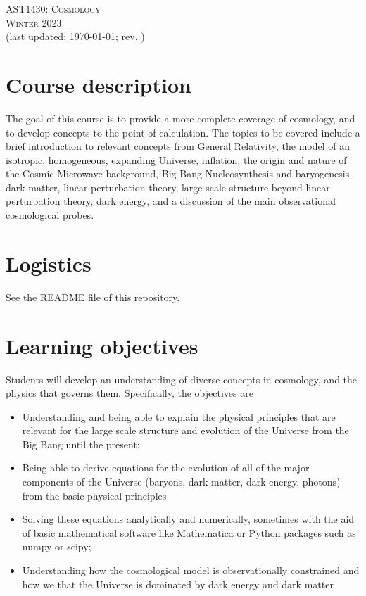 \documentclass{article}
\begin{document}
\begin{center}
  \LARGE{\scshape{AST1430: Cosmology}}\\[5pt]
  \Large{\scshape{Winter 2023}}\\[5pt]
  \large{(last updated: \today; rev. \githash)}\\[25pt]
\end{center}

\section*{Course description}

The goal of this course is to provide a more complete coverage of cosmology, 
and to develop concepts to the point of calculation. The topics to be covered 
include a brief introduction to relevant concepts from General Relativity, the 
model of an isotropic, homogeneous, expanding Universe, inflation, the origin 
and nature of the Cosmic Microwave background, Big-Bang Nucleosynthesis and 
baryogenesis, dark matter, linear perturbation theory, large-scale structure 
beyond linear perturbation theory, dark energy, and a discussion of the main 
observational cosmological probes.


\section*{Logistics}

See the README file of this repository.

\section*{Learning objectives}

Students will develop an understanding of diverse concepts in cosmology, and 
the physics that governs them. Specifically, the objectives are

\begin{itemize}

\item Understanding and being able to explain the physical principles that are 
  relevant for the large scale structure and evolution of the Universe from the 
  Big Bang until the present;

\item Being able to derive equations for the evolution of all of the major 
  components of the Universe (baryons, dark matter, dark energy, photons) from 
  the basic physical principles
\item Solving these equations analytically and numerically, sometimes with the 
  aid of basic mathematical software like Mathematica or Python packages such 
  as numpy or scipy;
\item Understanding how the cosmological model is observationally constrained 
  and how we that the Universe is dominated by dark energy and dark matter

\end{itemize}
\end{document}
